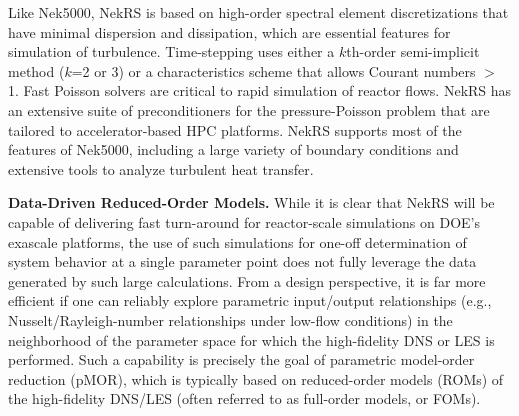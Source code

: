 Like Nek5000, NekRS is based on high-order spectral element
discretizations that have minimal dispersion and dissipation, which
are essential features for simulation of turbulence.  Time-stepping
uses either a $k$th-order semi-implicit method ($k$=2 or 3) or a
characteristics scheme that allows Courant numbers $>$ 1.
Fast Poisson solvers are critical to rapid simulation of reactor flows.
NekRS has an extensive suite of preconditioners for the pressure-Poisson
problem that are tailored to accelerator-based HPC platforms.  NekRS supports
most of the features of Nek5000, including a large variety of boundary
conditions and extensive tools to analyze turbulent heat transfer.





\noindent
{\bf Data-Driven Reduced-Order Models.}
While it is clear that NekRS will be capable of delivering fast turn-around
for reactor-scale simulations on DOE's exascale platforms, the use of
such simulations for one-off determination of system behavior at a single
parameter point does not fully leverage the data generated by such large
calculations.
From a design perspective, it is far more efficient if one can reliably
explore parametric input/output relationships (e.g., Nusselt/Rayleigh-number
relationships under low-flow conditions) in the neighborhood of the parameter
space for which the high-fidelity DNS or LES is performed.   Such a capability
is precisely the goal of parametric model-order reduction (pMOR), which is
typically based on reduced-order models (ROMs) of the high-fidelity DNS/LES
(often referred to as full-order models, or FOMs).

